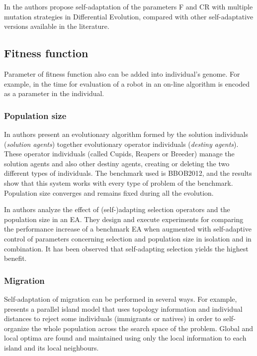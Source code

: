 In \cite{MutationDiffEvoPedrosa11} the authors propose self-adaptation of the parameters F and CR with multiple mutation strategies in Differential Evolution, compared with other self-adaptative versions available in the literature.

\subsection{Fitness function}
Parameter of fitness function also can be added into individual's genome. For example, in \cite{SelfAdaptingFitnessDinu13} the time for evaluation of a robot in an on-line algorithm is encoded as a parameter in the individual.




\subsubsection{Population size}

In \cite{FateBim10} authors present an evolutionary algorithm formed by the solution individuals ({\em solution agents}) together evolutionary operator individuals ({\em destiny agents}). These operator individuals (called Cupids, Reapers or Breeder) manage the solution agents and also other destiny agents, creating or deleting the two different types of individuals. The benchmark used is BBOB2012, and the results show that this system works with every type of problem of the benchmark. Population size converges and remains fixed during all the evolution.

In \cite{SelectionPressureEiben06} authors analyze the effect of (self-)adapting selection operators and the population size in an EA. They design and execute experiments for comparing the performance increase of a benchmark EA when augmented with self-adaptive control of parameters concerning selection and population size in isolation and in combination. It has been observed that self-adapting selection yields the highest benefit. 

\subsubsection{Migration}

Self-adaptation of migration can be performed in several ways. For example, \cite{SelfOrganizedPopulationFeng12} presents a parallel island model that uses topology information and individual distances to reject some individuals (immigrants or natives) in order to self-organize the whole population across the search space of the problem. Global and local optima are found and maintained using only the local information to each island and its local neighbours.
